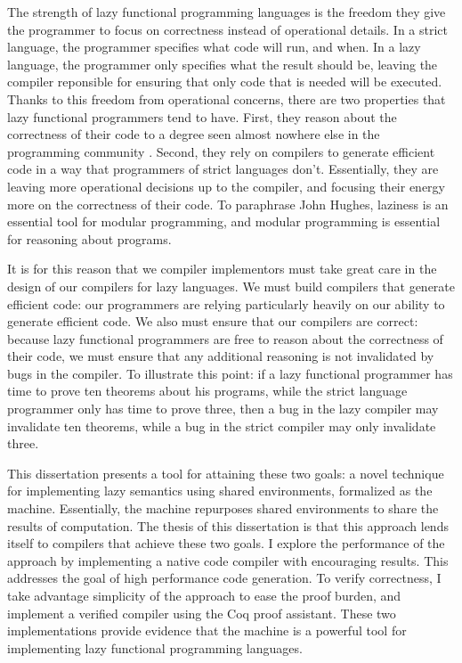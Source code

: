 The strength of lazy functional programming languages is the freedom they give
the programmer to focus on correctness instead of operational details. In a
strict language, the programmer specifies what code will run, and when. In a
lazy language, the programmer only specifies what the result should be, leaving
the compiler reponsible for ensuring that only code that is needed will be
executed. Thanks to this freedom from operational concerns, there are two
properties that lazy functional programmers tend to have. First, they reason
about the correctness of their code to a degree seen almost nowhere else in the
programming community \cite{hughes1989functional, spector2018total}.  Second,
they rely on compilers to generate efficient code in a way that programmers of
strict languages don't. Essentially, they are leaving more operational decisions
up to the compiler, and focusing their energy more on the correctness of their
code. To paraphrase John Hughes, laziness is an essential tool for modular
programming, and modular programming is essential for reasoning about programs. 

It is for this reason that we compiler implementors must take great care in the
design of our compilers for lazy languages. We must build compilers that
generate efficient code: our programmers are relying particularly heavily on
our ability to generate efficient code. We also must ensure that our compilers
are correct: because lazy functional programmers are free to reason about the
correctness of their code, we must ensure that any additional reasoning is not
invalidated by bugs in the compiler. To illustrate this point: if a lazy
functional programmer has time to prove ten theorems about his programs, while
the strict language programmer only has time to prove three, then a bug in the
lazy compiler may invalidate ten theorems, while a bug in the strict compiler
may only invalidate three.

This dissertation presents a tool for attaining these two goals: a novel
technique for implementing lazy semantics using shared environments, formalized
as the \ce machine. Essentially, the \ce machine repurposes shared environments
to share the results of computation. The thesis of this dissertation is that
this approach lends itself to compilers that achieve these two goals. I explore
the performance of the approach by implementing a native code compiler with
encouraging results. This addresses the goal of high performance code
generation. To verify correctness, I take advantage simplicity of the approach
to ease the proof burden, and implement a verified compiler using the Coq proof
assistant. These two implementations provide evidence that the \ce machine is a
powerful tool for implementing lazy functional programming languages.

